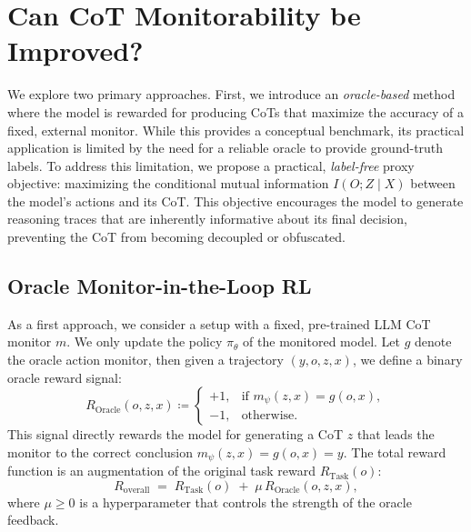 \documentclass{article}
\theoremstyle{plain}
\newcommand{\TR}{R_{\mathrm{Task}}}
\newcommand{\OR}{R_{\mathrm{Oracle}}}
\begin{document}

\section{Can CoT Monitorability be Improved?}
\label{sec:improving-cot-monitorability}

We explore two primary approaches. First, we introduce an \emph{oracle-based} method where the model is rewarded for producing CoTs that maximize the accuracy of a fixed, external monitor.
While this provides a conceptual benchmark, its practical application is limited by the need for a reliable oracle to provide ground-truth labels.
To address this limitation, we propose a practical, \emph{label-free} proxy objective: maximizing the conditional mutual information $I(O;Z \mid X)$ between the model's actions and its CoT.
This objective encourages the model to generate reasoning traces that are inherently informative about its final decision, preventing the CoT from becoming decoupled or obfuscated.


\subsection{Oracle Monitor-in-the-Loop RL}
\label{subsec:oracle}
As a first approach, we consider a setup with a fixed, pre-trained LLM CoT monitor $m$. We only update the policy $\pi_\theta$ of the monitored model.
Let $g$ denote the oracle action monitor, then given a trajectory $(y, o, z, x)$, we define a binary oracle reward signal:
% 
\begin{equation}
\OR(o, z, x) \coloneqq
  \begin{cases}
    +1, & \text{if } m_\psi(z, x) = g(o, x), \\
    -1, & \text{otherwise.}
  \end{cases}
\end{equation}
% 
This signal directly rewards the model for generating a CoT $z$ that leads the monitor to the correct conclusion $m_\psi(z, x) = g(o, x) = y$. 
The total reward function is an augmentation of the original task reward $\TR(o)$:
% 
\begin{equation}
R_{\text{overall}} \;=\; \TR(o)\;+\;\mu\,\OR(o, z, x),
\label{eq:oracle-reward-binary}
\end{equation}
% 
where $\mu\ge 0$ is a hyperparameter that controls the strength of the oracle feedback.
\end{document}
